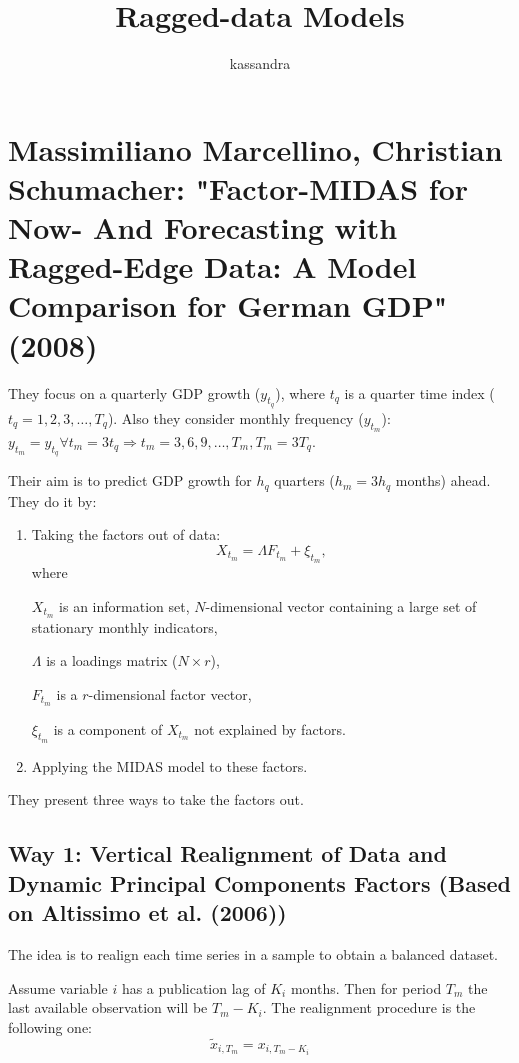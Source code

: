 \documentclass[8pt, a4paper, twocolumn, landscape]{extarticle}
\title{Ragged-data Models}
\author{kassandra}
\begin{document}
	
	\maketitle
	
	\section{Massimiliano Marcellino, Christian Schumacher: "Factor-MIDAS for Now- And Forecasting with Ragged-Edge Data: A Model Comparison for German GDP" (2008)}

	
	They focus on a quarterly GDP growth ($y_{t_q}$), where $t_q$ is a quarter time index ($t_q = 1, 2, 3, \dots, T_q$). Also they consider monthly frequency ($y_{t_m}$): $y_{t_m} = y_{t_q} \forall t_m = 3t_q \Rightarrow t_m = 3, 6, 9, \dots, T_m, T_m = 3T_q$.
	
	Their aim is to predict GDP growth for $h_q$ quarters ($h_m = 3h_q$ months) ahead. They do it by:
	\begin{enumerate}
		\item Taking the factors out of data:
		\[
		X_{t_m} = \Lambda F_{t_m} + \xi_{t_m},
		\]
		where 
		
		$X_{t_m}$ is an information set, $N$-dimensional vector containing a large set of stationary monthly indicators,
		
		$\Lambda$ is a loadings matrix ($N\times r$),
		
		$F_{t_m}$ is a $r$-dimensional factor vector,
		
		$\xi_{t_m}$ is a component of $X_{t_m}$ not explained by factors. 
		
		\item Applying the MIDAS model to these factors.
	\end{enumerate}
	They present three ways to take the factors out.
	
	\subsection{Way 1: Vertical Realignment of Data and Dynamic Principal Components Factors (Based on Altissimo et al. (2006))}
	
	The idea is to realign each time series in a sample to obtain a balanced dataset.
	
	Assume variable $i$ has a publication lag of $K_i$ months. Then for period $T_m$ the last available observation will be $T_m - K_i$. The realignment procedure is the following one:
	\[
	\tilde{x}_{i, T_m} = x_{i, T_m - K_i}
	\]
	
\end{document}
